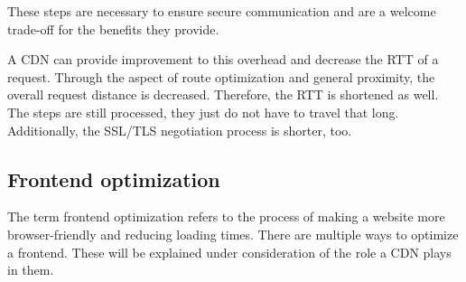 These steps are necessary to ensure secure communication and are a welcome trade-off for the benefits they provide. 

A CDN can provide improvement to this overhead and decrease the RTT of a request. Through the aspect of route optimization and general proximity, the overall request distance is decreased. Therefore, the RTT is shortened as well. The steps are still processed, they just do not have to travel that long. Additionally, the SSL/TLS negotiation process is shorter, too.\cite{cdn_ssl_tsl}

\subsection{Frontend optimization}

The term frontend optimization refers to the process of making a website more browser-friendly and reducing loading times. There are multiple ways to optimize a frontend. These will be explained under consideration of the role a CDN plays in them.



